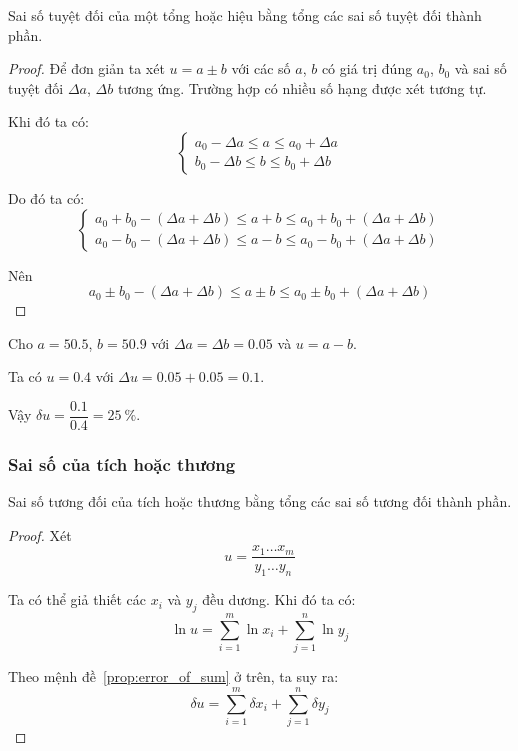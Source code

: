 \documentclass[../../Lectures.tex]{subfiles}
\begin{document}
\begin{proposition}\label{prop:error_of_sum}
    Sai số tuyệt đối của một tổng hoặc hiệu bằng tổng các sai số tuyệt đối thành
    phần.
\end{proposition}
\begin{proof}
    Để đơn giản ta xét \(u = a \pm b\) với các số \(a\), \(b\) có giá trị đúng
    \(a_0\), \(b_0\) và sai số tuyệt đối \(\Delta a\), \(\Delta b\) tương ứng.
    Trường hợp có nhiều số hạng được xét tương tự.

    Khi đó ta có:
    \[\begin{cases}
        a_0 - \Delta a \leq a \leq a_0 + \Delta a \\
        b_0 - \Delta b \leq b \leq b_0 + \Delta b
    \end{cases}\]

    Do đó ta có:
    \[\begin{cases}
        a_0 + b_0 - (\Delta a + \Delta b) \leq a + b \leq a_0 + b_0 + (\Delta a + \Delta b) \\
        a_0 - b_0 - (\Delta a + \Delta b) \leq a - b \leq a_0 - b_0 + (\Delta a + \Delta b)
    \end{cases}\]

    Nên
    \[a_0 \pm b_0 - (\Delta a + \Delta b) \leq a \pm b \leq a_0 \pm b_0 + (\Delta a + \Delta b)\]
\end{proof}

\begin{exmp}
    Cho \(a = \num{50.5}\), \(b = \num{50.9}\) với \(\Delta a = \Delta b =
    \num{0.05}\) và \(u = a - b\).

    Ta có \(u = \num{0.4}\) với \(\Delta u = \num{0.05} + \num{0.05} =
    \num{0.1}\).

    Vậy \(\delta u = \dfrac{\num{0.1}}{\num{0.4}} = \SI{25}{\percent}\).
\end{exmp}

\subsubsection{Sai số của tích hoặc thương}

\begin{proposition}
    Sai số tương đối của tích hoặc thương bằng tổng các sai số tương đối thành
    phần.
\end{proposition}
\begin{proof}
    Xét
    \[u = \frac{x_1 \ldots x_m}{y_1 \ldots y_n}\]

    Ta có thể giả thiết các \(x_i\) và \(y_j\) đều dương. Khi đó ta có:
    \[\ln{u} = \sum_{i=1}^{m} \ln{x_i} + \sum_{j=1}^{n} \ln{y_j}\]

    Theo mệnh đề~\ref{prop:error_of_sum} ở trên, ta suy ra:
    \[\delta u = \sum_{i=1}^{m} \delta x_i + \sum_{j=1}^{n} \delta y_j\]
\end{proof}
\end{document}
